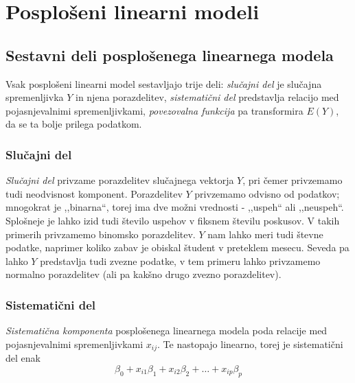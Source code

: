\documentclass[12pt,a4paper]{amsart}
\theoremstyle{definition} %
\theoremstyle{plain} %
\begin{document}
\section{Posplošeni linearni modeli}

\subsection{Sestavni deli posplošenega linearnega modela}
Vsak posplošeni linearni model sestavljajo trije deli: \textit{slučajni del} je slučajna spremenljivka $Y$ in njena porazdelitev, 
\textit{sistematični del} predstavlja relacijo med pojasnjevalnimi spremenljivkami, \textit{povezovalna funkcija} pa transformira $E(Y)$, da se ta
bolje prilega podatkom.

\subsubsection{Slučajni del}
\textit{Slučajni del} privzame porazdelitev slučajnega vektorja $Y$, pri čemer privzemamo tudi neodvisnost komponent. Porazdelitev $Y$
privzemamo odvisno od podatkov; mnogokrat je ,,binarna``, torej ima dve možni vrednosti - ,,uspeh`` ali ,,neuspeh``. Splošneje je lahko izid tudi 
število uspehov v fiksnem številu poskusov. V takih primerih privzamemo binomsko porazdelitev. $Y$ nam lahko meri tudi števne podatke, naprimer 
koliko zabav je obiskal študent v preteklem mesecu. Seveda pa lahko $Y$ predstavlja tudi zvezne podatke,
v tem primeru lahko privzamemo normalno porazdelitev (ali pa kakšno drugo zvezno porazdelitev).
\subsubsection{Sistematični del} 
\textit{Sistematična komponenta} posplošenega linearnega modela poda relacije med pojasnjevalnimi spremenljivkami $x_{ij}$. Te nastopajo 
linearno, torej je sistematični del enak
\[
\beta_{0} + x_{i1}\beta_{1} + x_{i2}\beta_{2} + \ldots + x_{ip}\beta_{p}
\]
\end{document}

